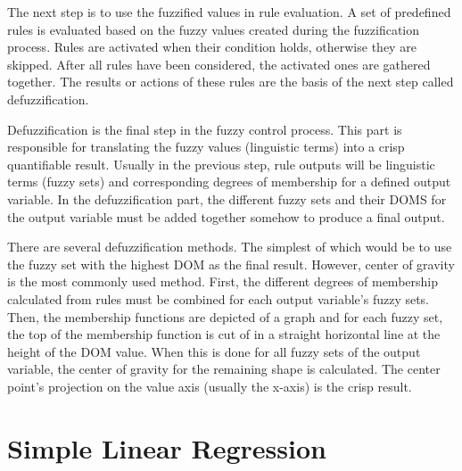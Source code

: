 The next step is to use the fuzzified values in rule evaluation. A set of predefined rules is evaluated based on the fuzzy values created during the fuzzification process. Rules are activated when their condition holds, otherwise they are skipped. After all rules have been considered, the activated ones are gathered together. The results or actions of these rules are the basis of the next step called defuzzification.

Defuzzification is the final step in the fuzzy control process. This part is responsible for translating the fuzzy values (linguistic terms) into a crisp quantifiable result. Usually in the previous step, rule outputs will be linguistic terms (fuzzy sets) and corresponding degrees of membership for a defined output variable. In the defuzzification part, the different fuzzy sets and their DOMS for the output variable must be added together somehow to produce a final output. 

There are several defuzzification methods. The simplest of which would be to use the fuzzy set with the highest DOM as the final result. However, center of gravity is the most commonly used method. First, the different degrees of membership calculated from rules must be combined for each output variable's fuzzy sets. Then, the membership functions are depicted of a graph and for each fuzzy set, the top of the membership function is cut of in a straight horizontal line at the height of the DOM value. When this is done for all fuzzy sets of the output variable, the center of gravity for the remaining shape is calculated. The center point's projection on the value axis (usually the x-axis) is the crisp result.

\section{Simple Linear Regression}




